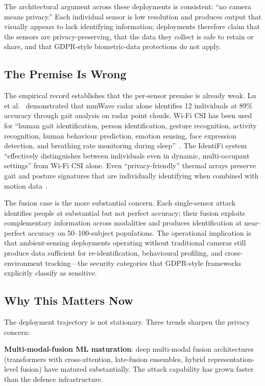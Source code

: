 \documentclass[sigconf,nonacm]{acmart}
\begin{document}
The architectural argument across these deployments is consistent:
``no camera means privacy.'' Each individual sensor is low
resolution and produces output that visually appears to lack
identifying information; deployments therefore claim that the
sensors are privacy-preserving, that the data they collect is
safe to retain or share, and that GDPR-style biometric-data
protections do not apply.

\subsection{The Premise Is Wrong}

The empirical record establishes that the per-sensor premise is
already weak. Lu et al.~\cite{lu2019mid} demonstrated that
mmWave radar alone identifies 12 individuals at 89\% accuracy
through gait analysis on radar point clouds. Wi-Fi CSI has been
used for ``human gait identification, person identification,
gesture recognition, activity recognition, human behaviour
prediction, emotion sensing, face expression detection, and
breathing rate monitoring during sleep''~\cite{hori2024merl}.
The IdentiFi system~\cite{rizk2025identifi} ``effectively
distinguishes between individuals even in dynamic,
multi-occupant settings'' from Wi-Fi CSI alone. Even
``privacy-friendly'' thermal arrays preserve gait and
posture signatures that are individually identifying when
combined with motion data~\cite{xie2024tadar}.

The fusion case is the more substantial concern. Each
single-sensor attack identifies people at substantial but
not perfect accuracy; their fusion exploits complementary
information across modalities and produces identification at
near-perfect accuracy on 50--100-subject populations. The
operational implication is that ambient-sensing deployments
operating without traditional cameras still produce data
sufficient for re-identification, behavioural profiling, and
cross-environment tracking---the security categories that
GDPR-style frameworks explicitly classify as sensitive.

\subsection{Why This Matters Now}

The deployment trajectory is not stationary. Three trends
sharpen the privacy concern:

\textbf{Multi-modal-fusion ML maturation}: deep multi-modal
fusion architectures (transformers with cross-attention,
late-fusion ensembles, hybrid representation-level fusion) have
matured substantially. The attack capability has grown faster
than the defence infrastructure.
\end{document}
